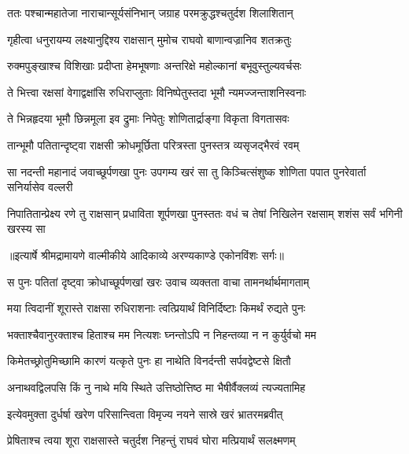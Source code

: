 \twolineshloka
{ततः पश्चान्महातेजा नाराचान्सूर्यसंनिभान्}
{जग्राह परमक्रुद्धश्चतुर्दश शिलाशितान्} %

\twolineshloka
{गृहीत्वा धनुरायम्य लक्ष्यानुद्दिश्य राक्षसान्}
{मुमोच राघवो बाणान्वज्रानिव शतक्रतुः} %

\twolineshloka
{रुक्मपुङ्खाश्च विशिखाः प्रदीप्ता हेमभूषणाः}
{अन्तरिक्षे महोल्कानां बभूवुस्तुल्यवर्चसः} %

\twolineshloka
{ते भित्त्वा रक्षसां वेगाद्वक्षांसि रुधिराप्लुताः}
{विनिष्पेतुस्तदा भूमौ न्यमज्जन्ताशनिस्वनाः} %

\twolineshloka
{ते भिन्नहृदया भूमौ छिन्नमूला इव द्रुमाः}
{निपेतुः शोणितार्द्राङ्गा विकृता विगतासवः} %

\twolineshloka
{तान्भूमौ पतितान्दृष्ट्वा राक्षसी क्रोधमूर्छिता}
{परित्रस्ता पुनस्तत्र व्यसृजद्भैरवं रवम्} %

\threelineshloka
{सा नदन्ती महानादं जवाच्छूर्पणखा पुनः}
{उपगम्य खरं सा तु किञ्चित्संशुष्क शोणिता}
{पपात पुनरेवार्ता सनिर्यासेव वल्लरी} %

\fourlineindentedshloka
{निपातितान्प्रेक्ष्य रणे तु राक्षसान्}
{प्रधाविता शूर्पणखा पुनस्ततः}
{वधं च तेषां निखिलेन रक्षसाम्}
{शशंस सर्वं भगिनी खरस्य सा} %


{॥इत्यार्षे श्रीमद्रामायणे वाल्मीकीये आदिकाव्ये अरण्यकाण्डे एकोनविंशः सर्गः॥}


\twolineshloka
{स पुनः पतितां दृष्ट्वा क्रोधाच्छूर्पणखां खरः}
{उवाच व्यक्तता वाचा तामनर्थार्थमागताम्} %

\twolineshloka
{मया त्विदानीं शूरास्ते राक्षसा रुधिराशनाः}
{त्वत्प्रियार्थं विनिर्दिष्टाः किमर्थं रुद्यते पुनः} %

\twolineshloka
{भक्ताश्चैवानुरक्ताश्च हिताश्च मम नित्यशः}
{घ्नन्तोऽपि न निहन्तव्या न न कुर्युर्वचो मम} %

\twolineshloka
{किमेतच्छ्रोतुमिच्छामि कारणं यत्कृते पुनः}
{हा नाथेति विनर्दन्ती सर्पवद्वेष्टसे क्षितौ} %

\twolineshloka
{अनाथवद्विलपसि किं नु नाथे मयि स्थिते}
{उत्तिष्ठोत्तिष्ठ मा भैषीर्वैक्लव्यं त्यज्यतामिह} %

\twolineshloka
{इत्येवमुक्ता दुर्धर्षा खरेण परिसान्त्विता}
{विमृज्य नयने सास्रे खरं भ्रातरमब्रवीत्} %

\twolineshloka
{प्रेषिताश्च त्वया शूरा राक्षसास्ते चतुर्दश}
{निहन्तुं राघवं घोरा मत्प्रियार्थं सलक्ष्मणम्} %

